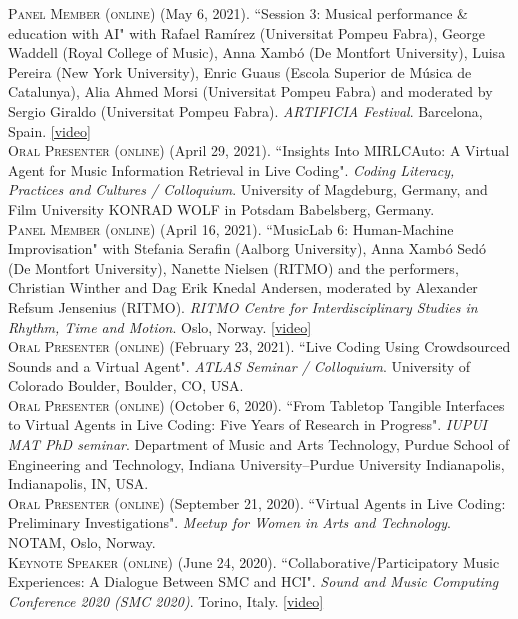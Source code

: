 \documentclass[10pt, a4paper]{article}
\newcommand{\years}[1]{\marginnote{\scriptsize #1}}
\begin{document}
{\years{2021d} \textsc{Panel Member (online)} (May 6, 2021). “Session 3: Musical performance \& education with AI" with Rafael Ramírez (Universitat Pompeu Fabra), George Waddell (Royal College of Music), Anna Xambó (De Montfort University), Luisa Pereira (New York University), Enric Guaus (Escola Superior de Música de Catalunya), Alia Ahmed Morsi (Universitat Pompeu Fabra) and moderated by Sergio Giraldo (Universitat Pompeu Fabra). \emph{ARTIFICIA Festival}. Barcelona, Spain. \href{https://youtu.be/o0arHV4s6Mo}{[video]}\\ 
\years{2021c} \textsc{Oral Presenter (online)} (April 29, 2021). “Insights Into MIRLCAuto: A Virtual Agent for Music Information Retrieval in Live Coding". \emph{Coding Literacy, Practices and Cultures / Colloquium}. University of Magdeburg, Germany, and Film University KONRAD WOLF in Potsdam Babelsberg, Germany.\\ 
\years{2021b} \textsc{Panel Member (online)} (April 16, 2021). “MusicLab 6: Human-Machine Improvisation" with Stefania Serafin (Aalborg University), Anna Xambó Sedó (De Montfort University), Nanette Nielsen (RITMO) and the performers, Christian Winther and Dag Erik Knedal Andersen, moderated by Alexander Refsum Jensenius (RITMO). \emph{RITMO Centre for Interdisciplinary Studies in Rhythm, Time and Motion}. Oslo, Norway. \href{https://youtu.be/yeIRxkm-kSc}{[video]}\\ 
\years{2021a} \textsc{Oral Presenter (online)} (February 23, 2021). “Live Coding Using Crowdsourced Sounds and a Virtual Agent". \emph{ATLAS Seminar / Colloquium}. University of Colorado Boulder, Boulder, CO, USA.\\ 
\years{2020c} \textsc{Oral Presenter (online)} (October 6, 2020). “From Tabletop Tangible Interfaces to Virtual Agents in Live Coding: Five Years of Research in Progress". \emph{IUPUI MAT PhD seminar}. Department of Music and Arts Technology, Purdue School of Engineering and Technology, Indiana University--Purdue University Indianapolis, Indianapolis, IN, USA.\\ 
\years{2020b} \textsc{Oral Presenter (online)} (September 21, 2020). “Virtual Agents in Live Coding: Preliminary Investigations". \emph{Meetup for Women in Arts and Technology}. NOTAM, Oslo, Norway.\\ 
\years{2020a} \textsc{Keynote Speaker (online)} (June 24, 2020). “Collaborative/Participatory Music Experiences: A Dialogue Between SMC and HCI". \emph{Sound and Music Computing Conference 2020 (SMC 2020)}. Torino, Italy. \href{https://youtu.be/fWqhhdkVO6o}{[video]}\\ 
}
\end{document}

